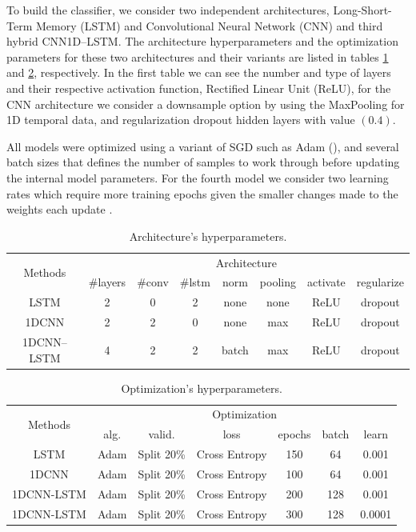 To build the classifier, we consider two independent architectures, Long-Short-Term Memory (LSTM) and Convolutional Neural Network (CNN) and third hybrid CNN1D--LSTM. The architecture hyperparameters and the optimization parameters for these two architectures and their variants are listed in tables \ref{Table:HyperparametersNN} and \ref{Table:OptimizationNN}, respectively. In the first table we can see the number and type of layers and their respective activation function, Rectified Linear Unit (ReLU), for the CNN architecture we consider a downsample option by using the MaxPooling for 1D temporal data, and regularization dropout hidden layers with value $(0.4)$.

All models were optimized using a variant of SGD such as Adam (\cite{Kingma2015}), and several batch sizes that defines the number of samples to work through before updating the internal model parameters. For the fourth model we consider two learning rates which require more training epochs given the smaller changes made to the weights each update \cite{}.

\begin{table}[h]
	\centering
	\tiny
	\begin{tabular}{|c|c|c|c|c|c|c|c|}
		\hline
		\multirow{2}{*}{Methods} & \multicolumn{7}{c|}{Architecture} \\
		\cline{2-8}
		& \#layers & \#conv & \#lstm & norm & pooling & activate & regularize \\
		\cline{2-8}
		\hline
		LSTM & 2 & 0 & 2 & none & none & ReLU & dropout \\
		\hline
		1DCNN & 2 & 2 & 0 & none & max & ReLU & dropout \\
		\hline
		1DCNN--LSTM & 4 & 2 & 2 & batch & max & ReLU & dropout  \\
		\hline
	\end{tabular}
	\caption{Architecture’s hyperparameters.}
	\label{Table:HyperparametersNN}
\end{table}

\begin{table}[h]
	\centering
	\tiny
	\begin{tabular}{|c|c|c|c|c|c|c|}
		\hline
		\multirow{2}{*}{Methods} & \multicolumn{6}{c|}{Optimization} \\
		\cline{2-7}
		& alg. & valid. & loss & epochs & batch & learn \\
		\cline{2-7}
		\hline
		LSTM & Adam & Split 20\% & Cross Entropy & 150 & 64 & 0.001 \\
		\hline
		1DCNN & Adam & Split 20\% & Cross Entropy & 100 & 64 & 0.001 \\
		\hline
		1DCNN-LSTM & Adam & Split 20\% & Cross Entropy & 200 & 128 & 0.001 \\
		\hline
		1DCNN-LSTM & Adam & Split 20\% & Cross Entropy & 300 & 128 & 0.0001 \\
		\hline
	\end{tabular}
	\caption{Optimization’s hyperparameters.}
	\label{Table:OptimizationNN}
\end{table}

